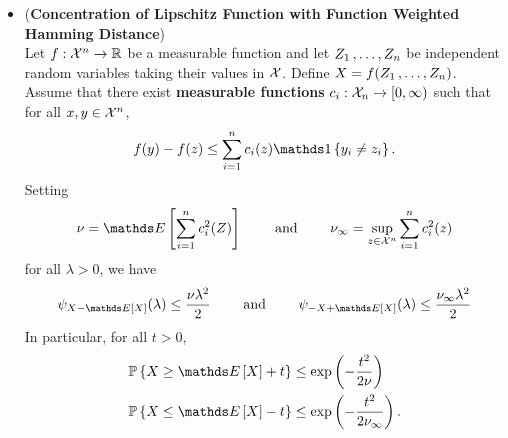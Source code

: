 \documentclass[11pt]{article}
\begin{document}
\begin{itemize}
\item \begin{proposition} (\textbf{Concentration of Lipschitz Function with Function Weighted Hamming Distance}) \citep{boucheron2013concentration}\\
Let $f: {\mathcal X}^n \to {\mathbb R}$ be a measurable function and let $Z_1 \,{,}\ldots{,}\, Z_n$ be independent random variables taking their values in ${\mathcal X}$. Define $X = f(Z_1 \,{,}\ldots{,}\, Z_n)$. Assume that there exist \textbf{measurable functions} $c_i: {\mathcal X}_n \to [0, \infty)$ such that for all $x, y \in {\mathcal X}^n$, 
\begin{align*}
f(y) - f(z) \le \sum_{i=1}^{n}c_i(z) \ind{y_i \neq z_i}.
\end{align*} Setting
\begin{align*}
\nu = \E{}{\sum_{i=1}^{n}c_i^2(Z)} \qquad \text{ and }\qquad \nu_{\infty} = \sup_{z \in \cX^n}\sum_{i=1}^{n}c_i^2(z)
\end{align*} for all $\lambda  > 0$, we have 
\begin{align*}
\psi_{X - \E{}{X}}(\lambda) \le \frac{\nu \lambda^2}{2} \qquad \text{ and }\qquad \psi_{- X + \E{}{X}}(\lambda) \le \frac{\nu_{\infty} \lambda^2}{2}
\end{align*} In particular, for all $t > 0$,
\begin{align}
\bP\set{X \ge \E{}{X}  + t} &\le \exp\paren{-\frac{t^2}{2\nu}} \nonumber\\
\bP\set{X \le \E{}{X}  - t}   &\le \exp\paren{-\frac{t^2}{2\nu_{\infty}}}. \label{ineqn: weakly_self_bounding_sub_gaussian}
\end{align}
\end{proposition}


\end{itemize}
\end{document}
